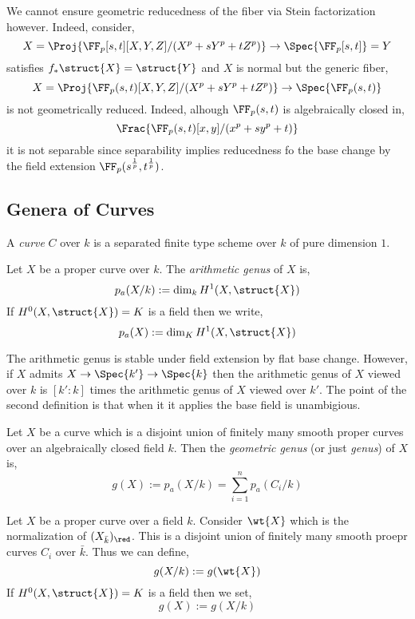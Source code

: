 \documentclass[12pt]{article}
\begin{document}
\begin{example}
We cannot ensure geometric reducedness of the fiber via Stein factorization however. Indeed, consider,
\[ X = \Proj{\FF_p[s,t][X,Y,Z]/(X^p + s Y^p + t Z^p)} \to \Spec{\FF_p[s,t]}= Y \]
satisfies $f_* \struct{X} = \struct{Y}$ and $X$ is normal but the generic fiber,
\[ X = \Proj{\FF_p(s,t)[X,Y,Z]/(X^p + s Y^p + t Z^p)} \to \Spec{\FF_p(s,t)} \]
is not geometrically reduced. Indeed, alhough $\FF_p(s,t)$ is algebraically closed in,
\[ \Frac{\FF_p(s,t)[x,y]/(x^p + s y^p + t)} \]
it is not separable since separability implies reducedness fo the base change by the field extension $\FF_p(s^{\frac{1}{p}}, t^{\frac{1}{p}})$.
\end{example}


\subsection{Genera of Curves}

\begin{defn}
A \textit{curve} $C$ over $k$ is a separated finite type scheme over $k$ of pure dimension $1$.
\end{defn}

\begin{defn}
Let $X$ be a proper curve over $k$. The \textit{arithmetic genus} of $X$ is,
\[ p_a(X/k) := \dim_k H^1(X, \struct{X}) \]
If $H^0(X, \struct{X}) = K$ is a field then we write,
\[ p_a(X) := \dim_K H^1(X, \struct{X}) \]
\end{defn}

\begin{rmk}
The arithmetic genus is stable under field extension by flat base change. However, if $X$ admits $X \to \Spec{k'} \to \Spec{k}$ then the arithmetic genus of $X$ viewed over $k$ is $[k' : k]$ times the arithmetic genus of $X$ viewed over $k'$. The point of the second definition is that when it it applies the base field is unambigious.
\end{rmk}

\begin{defn}
Let $X$ be a curve which is a disjoint union of finitely many smooth proper curves over an algebraically closed field $k$. Then the \textit{geometric genus} (or just \textit{genus}) of $X$ is,
\[ g(X) := p_a(X/k) = \sum_{i = 1}^n p_a(C_i / k) \]
\end{defn}


\begin{defn}
Let $X$ be a proper curve over a field $k$. Consider $\wt{X}$ which is the normalization of $(X_{\bar{k}})_{\red}$. This is a disjoint union of finitely many smooth proepr curves $C_i$ over $\bar{k}$. Thus we can define,
\[ g(X/k) := g(\wt{X}) \]
If $H^0(X, \struct{X}) = K$ is a field then we set,
\[ g(X) := g(X/k) \]
\end{defn}
\end{document}
